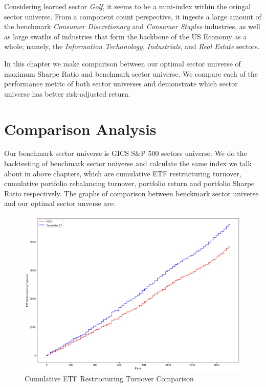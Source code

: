 \documentclass[../main.tex]{subfiles}
\begin{document}
Considering learned sector \textit{Golf}, it seems to be a mini-index within the oringal sector universe. From a component count perspective, it ingests a large amount of the benchmark \textit{Consumer Discretionary} and \textit{Consumer Staples} industries, as well as large swaths of industries that form the backbone of the US Economy as a whole; namely, the \textit{Information Techonology}, \textit{Industrials}, and \textit{Real Estate} sectors.

In this chapter we make comparison between our optimal sector universe of maximum Sharpe Ratio and benchmark sector universe. We compare each of the performance metric of both sector universes and demonstrate which sector universe has better risk-adjusted return.  

\section{Comparison Analysis}

Our benchmark sector universe is GICS S\&P 500 sectors universe. We do the backtesting of benchmark sector universe and calculate the same index we talk about in above chapters, which are cumulative ETF restructuring turnover, cumulative portfolio rebalancing turnover, portfolio return and portfolio Sharpe Ratio  respectively. The graphs of comparison between benckmark sector universe and our optimal sector unverse are: 

\begin{figure}[H]
    \centering
    \includegraphics[scale=0.4]{images/etf_restrut_compare.png}
    \caption{Cumulative ETF Restructuring Turnover Comparison}
    \label{fig:benchmark_comparison:restrut_turnover_comparison}
\end{figure} 
\end{document}
